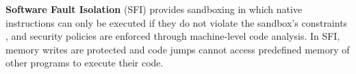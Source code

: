 \textbf{Software Fault Isolation} (SFI)
provides sandboxing in which native
instructions can only be executed if they do not violate the sandbox's
constraints \cite{SFI:93}, and security policies are enforced through machine-level
code analysis. In SFI, memory
writes are protected and code jumps cannot access predefined memory of
other programs to execute their code.
%
%
%
%
